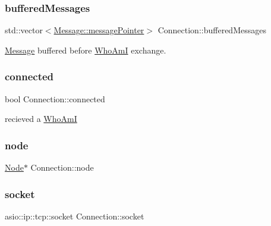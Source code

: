 \mbox{\label{classConnection_ad5f7e4d6f209106c33e9e996a0c49932}} 
\subsubsection{\texorpdfstring{buffered\+Messages}{bufferedMessages}}
{\footnotesize\ttfamily std\+::vector$<$\mbox{\hyperlink{classMessage_a3f7f2aa1058cb5f0b74a1fbb7fcd00e5}{Message\+::message\+Pointer}}$>$ Connection\+::buffered\+Messages\hspace{0.3cm}{\ttfamily [private]}}



\mbox{\hyperlink{classMessage}{Message}} buffered before \mbox{\hyperlink{classWhoAmI}{Who\+AmI}} exchange. 

\mbox{\label{classConnection_a1445f1ca4d7fd2155a7de480340b370a}} 
\subsubsection{\texorpdfstring{connected}{connected}}
{\footnotesize\ttfamily bool Connection\+::connected\hspace{0.3cm}{\ttfamily [private]}}



recieved a \mbox{\hyperlink{classWhoAmI}{Who\+AmI}} 

\mbox{\label{classConnection_a0e90a6ef9361901f3d7c25e00d0a2016}} 
\subsubsection{\texorpdfstring{node}{node}}
{\footnotesize\ttfamily \mbox{\hyperlink{classNode}{Node}}$\ast$ Connection\+::node\hspace{0.3cm}{\ttfamily [private]}}

\mbox{\label{classConnection_a8b4cf76de02e4eaa6a2afdc65c42cfdc}} 
\subsubsection{\texorpdfstring{socket}{socket}}
{\footnotesize\ttfamily asio\+::ip\+::tcp\+::socket Connection\+::socket\hspace{0.3cm}{\ttfamily [private]}}

